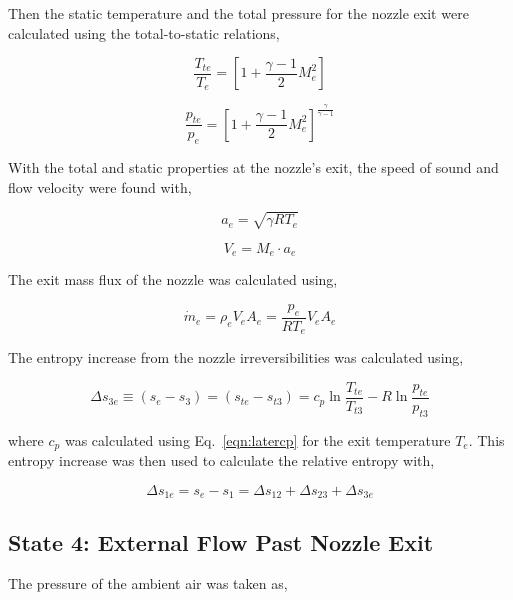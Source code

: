 \documentclass[conf]{new-aiaa} %
\begin{document}
Then the static temperature and the total pressure for the nozzle exit were calculated using the total-to-static relations,

\begin{equation}
    \label{eqn:Te}
    \frac{T_{te}}{T_e}=\left[1+\frac{\gamma-1}{2}M_e^2\right]
\end{equation}

\begin{equation}
    \label{eqn:pte}
    \frac{p_{te}}{p_e}=\left[1+\frac{\gamma-1}{2}M_e^2\right]^\frac{\gamma}{\gamma-1}
\end{equation}

With the total and static properties at the nozzle's exit, the speed of sound and flow velocity were found with,

\begin{equation}
    \label{eqn:ae}
    a_e=\sqrt{\gamma R T_e}
\end{equation}

\begin{equation}
    \label{eqn:Ve}
    V_e=M_e\cdot a_e
\end{equation}

The exit mass flux of the nozzle was calculated using,

\begin{equation}
    \label{eqn:mdote}
    \dot{m}_e=\rho_e V_e A_e=\frac{p_e}{R T_e}V_e A_e
\end{equation}

The entropy increase from the nozzle irreversibilities was calculated using,

\begin{equation}
    \label{eqn:dels3e}
    \Delta s_{3e}\equiv\left(s_e-s_3\right)=\left(s_{te}-s_{t3}\right)=c_p \ln\frac{T_{te}}{T_{t3}}-R\ln\frac{p_{te}}{p_{t3}}
\end{equation}

where $c_p$ was calculated using Eq.~\eqref{eqn:latercp} for the exit temperature $T_e$. This entropy increase was then used to calculate the relative entropy with,

\begin{equation}
    \label{eqn:dels1e}
    \Delta s_{1e}=s_e-s_1=\Delta s_{12}+\Delta s_{23}+\Delta s_{3e}
\end{equation}

\subsection{State 4: External Flow Past Nozzle Exit}
The pressure of the ambient air was taken as,
\end{document}
